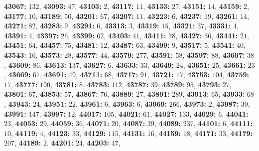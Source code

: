 \textsf{\bfseries 43067:} $132$, \textsf{\bfseries 43093:} $47$, \textsf{\bfseries 43103:} $2$, \textsf{\bfseries 43117:} $11$, \textsf{\bfseries 43133:} $27$, \textsf{\bfseries 43151:} $14$, \textsf{\bfseries 43159:} $2$, \textsf{\bfseries 43177:} $10$, \textsf{\bfseries 43189:} $50$, \textsf{\bfseries 43201:} $67$, \textsf{\bfseries 43207:} $11$, \textsf{\bfseries 43223:} $6$, \textsf{\bfseries 43237:} $19$, \textsf{\bfseries 43261:} $14$, \textsf{\bfseries 43271:} $82$, \textsf{\bfseries 43283:} $9$, \textsf{\bfseries 43291:} $6$, \textsf{\bfseries 43313:} $3$, \textsf{\bfseries 43319:} $15$, \textsf{\bfseries 43321:} $37$, \textsf{\bfseries 43331:} $4$, \textsf{\bfseries 43391:} $4$, \textsf{\bfseries 43397:} $26$, \textsf{\bfseries 43399:} $62$, \textsf{\bfseries 43403:} $41$, \textsf{\bfseries 43411:} $78$, \textsf{\bfseries 43427:} $36$, \textsf{\bfseries 43441:} $21$, \textsf{\bfseries 43451:} $64$, \textsf{\bfseries 43457:} $75$, \textsf{\bfseries 43481:} $12$, \textsf{\bfseries 43487:} $63$, \textsf{\bfseries 43499:} $9$, \textsf{\bfseries 43517:} $5$, \textsf{\bfseries 43541:} $40$, \textsf{\bfseries 43543:} $16$, \textsf{\bfseries 43573:} $28$, \textsf{\bfseries 43577:} $44$, \textsf{\bfseries 43579:} $277$, \textsf{\bfseries 43591:} $58$, \textsf{\bfseries 43597:} $88$, \textsf{\bfseries 43607:} $38$, \textsf{\bfseries 43609:} $86$, \textsf{\bfseries 43613:} $137$, \textsf{\bfseries 43627:} $6$, \textsf{\bfseries 43633:} $33$, \textsf{\bfseries 43649:} $24$, \textsf{\bfseries 43651:} $25$, \textsf{\bfseries 43661:} $23$, \textsf{\bfseries 43669:} $67$, \textsf{\bfseries 43691:} $49$, \textsf{\bfseries 43711:} $68$, \textsf{\bfseries 43717:} $91$, \textsf{\bfseries 43721:} $17$, \textsf{\bfseries 43753:} $104$, \textsf{\bfseries 43759:} $17$, \textsf{\bfseries 43777:} $190$, \textsf{\bfseries 43781:} $8$, \textsf{\bfseries 43783:} $112$, \textsf{\bfseries 43787:} $39$, \textsf{\bfseries 43789:} $95$, \textsf{\bfseries 43793:} $27$, \textsf{\bfseries 43801:} $67$, \textsf{\bfseries 43853:} $57$, \textsf{\bfseries 43867:} $76$, \textsf{\bfseries 43889:} $27$, \textsf{\bfseries 43891:} $289$, \textsf{\bfseries 43913:} $65$, \textsf{\bfseries 43933:} $68$, \textsf{\bfseries 43943:} $24$, \textsf{\bfseries 43951:} $22$, \textsf{\bfseries 43961:} $6$, \textsf{\bfseries 43963:} $6$, \textsf{\bfseries 43969:} $266$, \textsf{\bfseries 43973:} $2$, \textsf{\bfseries 43987:} $39$, \textsf{\bfseries 43991:} $147$, \textsf{\bfseries 43997:} $12$, \textsf{\bfseries 44017:} $105$, \textsf{\bfseries 44021:} $61$, \textsf{\bfseries 44027:} $133$, \textsf{\bfseries 44029:} $6$, \textsf{\bfseries 44041:} $23$, \textsf{\bfseries 44053:} $29$, \textsf{\bfseries 44059:} $36$, \textsf{\bfseries 44071:} $20$, \textsf{\bfseries 44087:} $39$, \textsf{\bfseries 44089:} $237$, \textsf{\bfseries 44101:} $6$, \textsf{\bfseries 44111:} $10$, \textsf{\bfseries 44119:} $4$, \textsf{\bfseries 44123:} $33$, \textsf{\bfseries 44129:} $115$, \textsf{\bfseries 44131:} $16$, \textsf{\bfseries 44159:} $18$, \textsf{\bfseries 44171:} $33$, \textsf{\bfseries 44179:} $207$, \textsf{\bfseries 44189:} $2$, \textsf{\bfseries 44201:} $24$, \textsf{\bfseries 44203:} $47$, 
